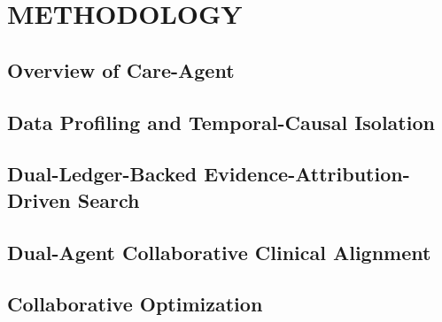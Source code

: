 \section{METHODOLOGY}
\subsection{Overview of Care-Agent}
\subsection{Data Profiling and Temporal-Causal Isolation}
\subsection{Dual-Ledger-Backed Evidence-Attribution-Driven Search}
\subsection{Dual-Agent Collaborative Clinical Alignment}
\subsection{Collaborative Optimization}